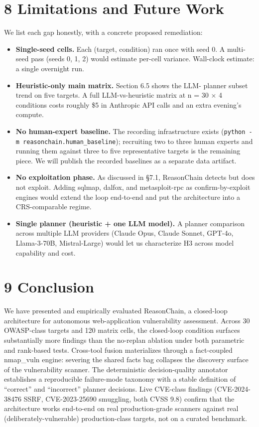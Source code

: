 \documentclass[
]{article}
\begin{document}
\section{8 Limitations and Future
Work}\label{limitations-and-future-work}

We list each gap honestly, with a concrete proposed remediation:

\begin{itemize}
\item
  \textbf{Single-seed cells.} Each (target, condition) ran once with
  seed 0. A multi-seed pass (seeds 0, 1, 2) would estimate per-cell
  variance. Wall-clock estimate: a single overnight run.
\item
  \textbf{Heuristic-only main matrix.} Section 6.5 shows the LLM-
  planner subset trend on five targets. A full LLM-vs-heuristic matrix
  at n = 30 × 4 conditions costs roughly \$5 in Anthropic API calls and
  an extra evening's compute.
\item
  \textbf{No human-expert baseline.} The recording infrastructure exists
  (\texttt{python\ -m\ reasonchain.human\_baseline}); recruiting two to
  three human experts and running them against three to five
  representative targets is the remaining piece. We will publish the
  recorded baselines as a separate data artifact.
\item
  \textbf{No exploitation phase.} As discussed in §7.1, ReasonChain
  detects but does not exploit. Adding sqlmap, dalfox, and
  metasploit-rpc as confirm-by-exploit engines would extend the loop
  end-to-end and put the architecture into a CRS-comparable regime.
\item
  \textbf{Single planner (heuristic + one LLM model).} A planner
  comparison across multiple LLM providers (Claude Opus, Claude Sonnet,
  GPT-4o, Llama-3-70B, Mistral-Large) would let us characterize H3
  across model capability and cost.
\end{itemize}

\section{9 Conclusion}\label{conclusion}

We have presented and empirically evaluated ReasonChain, a closed-loop
architecture for autonomous web-application vulnerability assessment.
Across 30 OWASP-class targets and 120 matrix cells, the closed-loop
condition surfaces substantially more findings than the no-replan
ablation under both parametric and rank-based tests. Cross-tool fusion
materializes through a fact-coupled nmap\_vuln engine: severing the
shared facts bag collapses the discovery surface of the vulnerability
scanner. The deterministic decision-quality annotator establishes a
reproducible failure-mode taxonomy with a stable definition of
``correct'' and ``incorrect'' planner decisions. Live CVE-class findings
(CVE-2024-38476 SSRF, CVE-2023-25690 smuggling, both CVSS 9.8) confirm
that the architecture works end-to-end on real production-grade scanners
against real (deliberately-vulnerable) production-class targets, not on
a curated benchmark.
\end{document}
